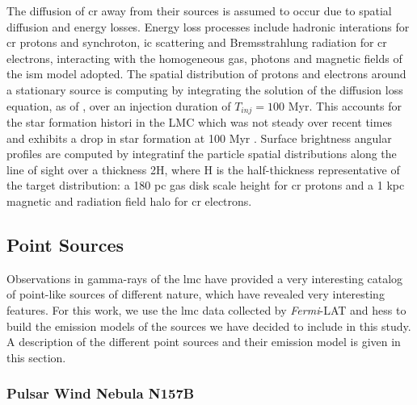 \documentclass[main.tex]{subfiles}
\begin{document}
The diffusion of \gls{cr} away from their sources is assumed to occur due to spatial diffusion and energy losses. Energy loss processes include hadronic interations for \gls{cr} protons and synchroton, \gls{ic} scattering and Bremsstrahlung radiation for \gls{cr} electrons, interacting with the homogeneous gas, photons and magnetic fields of the \gls{ism} model adopted. The spatial distribution of protons and electrons around a stationary source is computing by integrating the solution of the diffusion loss equation, as of \cite{2006diffusionloss}, over an injection duration of $T_{inj} = 100$ Myr. This accounts for the star formation histori in the \gls{LMC} which was not steady over recent times and exhibits a drop in star formation at 100 Myr \cite{2009SFHofLMC}. Surface brightness angular profiles are computed by integratinf the particle spatial distributions along the line of sight over a thickness 2H, where H is the half-thickness representative of the target distribution: a 180 pc gas disk scale height for \gls{cr} protons and a 1 kpc magnetic and radiation field halo for \gls{cr} electrons.   


\subsection{Point Sources}

Observations in gamma-rays of the \gls{lmc} have provided a very interesting catalog of point-like sources of different nature, which have revealed very interesting features. For this work, we use the \gls{lmc} data collected by \textit{Fermi}-LAT \cite{2010FermiLATLMC11months} \cite{2016LMCFermiLAT} and \gls{hess} \cite{2012HESSLMC} \cite{2015HESSTeVLMC} \cite{2017HESSLMCP3} to build the emission models of the sources we have decided to include in this study. A description of the different point sources and their emission model is given in this section.

\subsubsection{Pulsar Wind Nebula N157B}
\end{document}
